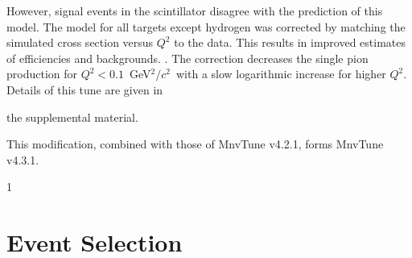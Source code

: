 \documentclass[aps,preprint,showpacs,superscriptaddress,letterpaper,showkeys,superscriptaddress,nofootinbib,floatfix]{revtex4-1}
\newcommand{\gevsqcsq}{GeV$^2/c^2$}
\newcommand{\secondReviewAdd}[1]{{\bf\color{purple} \protect #1}}
\newcommand{\secondReviewStrike}[1]{{\bf\color{purple}\protect \sout{#1}}}
\newcommand{\firstRefereeAdd}[1]{{\bf\color{green} \protect #1}}
\newcommand{\firstRefereeStrike}[1]{{\bf\color{green}\protect \sout{#1}}}
\newcommand{\showSections}[0]{0}
\renewcommand{\secondReviewAdd}[1]{\protect #1}
\renewcommand{\secondReviewStrike}[1]{}
\renewcommand{\firstRefereeAdd}[1]{\protect #1}
\renewcommand{\firstRefereeStrike}[1]{}
\newcommand{\supp}{the supplemental material}
\newif\ifPRLandSupp
\begin{document}
\secondReviewStrike{Pion production through baryon resonances is modified to match the $D_2$ bubble chamber data as in Ref.~\cite{Rodrigues:2016xjj}.} However, \firstRefereeStrike{the study of events in the scintillator target found a significant disagreement} \firstRefereeAdd{signal events in the scintillator disagree} with the prediction of this model\firstRefereeStrike{; t}.  The model \firstRefereeAdd{for all targets except hydrogen} was corrected \firstRefereeAdd{by matching the simulated cross section versus $Q^2$ to the data.  This results in improved estimates of}\firstRefereeStrike{ to produce accurate} efficiencies and \firstRefereeStrike{subtractions of background distributions}\firstRefereeAdd{backgrounds}.  \firstRefereeStrike{For all targets except hydrogen, this correction was made by matching the reconstructed $Q^2$ distribution in the scintillator tracker to the simulation}.  The correction \firstRefereeStrike{significantly} decreases the single pion production for $Q^2<0.1$~\gevsqcsq~with a slow logarithmic increase for higher $Q^2$.  Details of this tune are given in 
\ifPRLandSupp
\supp\firstRefereeStrike{, section \ref{section:LowQ2Tune}}.
\else
\supp.
\fi
\firstRefereeStrike{\secondReviewAdd{This last tune completes ``MnvTune v4.3.1".}}
\firstRefereeAdd{This modification, combined with those of MnvTune v4.2.1, 
 forms MnvTune v4.3.1.}


\if\showSections1 \section{Event Selection} \fi
\end{document}
